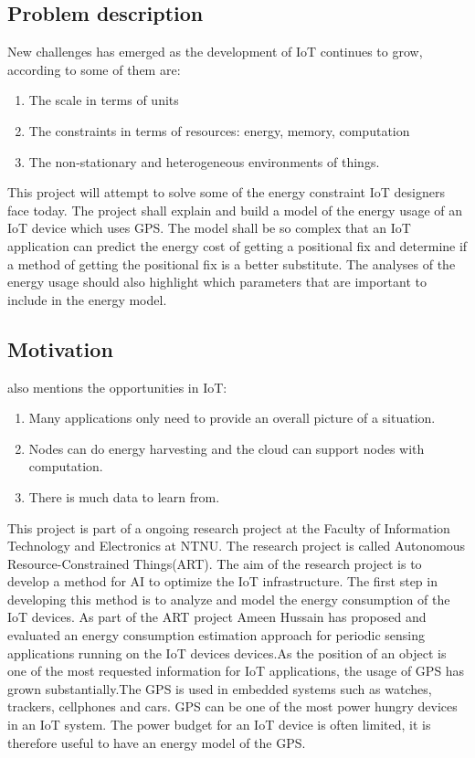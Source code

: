 \subsection{Problem description}
New challenges has emerged as the development of IoT continues to grow, according to \cite{frank} some of them are:

\begin{enumerate}
    \item The scale in terms of units
    \item The constraints in terms of resources: energy, memory, computation
    \item The non-stationary and heterogeneous environments of things.
    
\end{enumerate}

This project will attempt to solve some of the energy constraint IoT designers face today. The project shall explain and build a model of the energy usage of an IoT device which uses GPS. The model shall be so complex that an IoT application can predict the energy cost of getting a positional fix and determine if a method of getting the positional fix is a better substitute. The analyses of the energy usage should also highlight which parameters that are important to include in the energy model. %
\\
\subsection{Motivation}
\cite{frank} also mentions the opportunities in IoT: 
\begin{enumerate}
    \item Many applications only need to provide an overall picture of a situation.
    \item Nodes can	do energy harvesting and the cloud can support nodes with computation.
    \item There	is much data to learn from.
    
\end{enumerate}
This project is part of a ongoing research project at the Faculty of Information Technology and Electronics at NTNU. The research project is called Autonomous Resource-Constrained Things(ART). The aim of the research project is to develop a method for AI to optimize the IoT infrastructure. The first step in developing this method is to analyze and model the energy consumption of the IoT devices. As part of the ART project Ameen Hussain has proposed and evaluated an energy consumption estimation approach for periodic sensing applications running on the IoT devices
devices\cite{Amen}.As the position of an object is one of the most requested information for IoT applications, the usage of GPS has grown substantially.The GPS is used in embedded systems such as watches, trackers, cellphones and cars. GPS can be one of the most power hungry devices in an IoT system. The power budget for an IoT device is often limited, it is therefore useful to have an energy model of the GPS.\\

